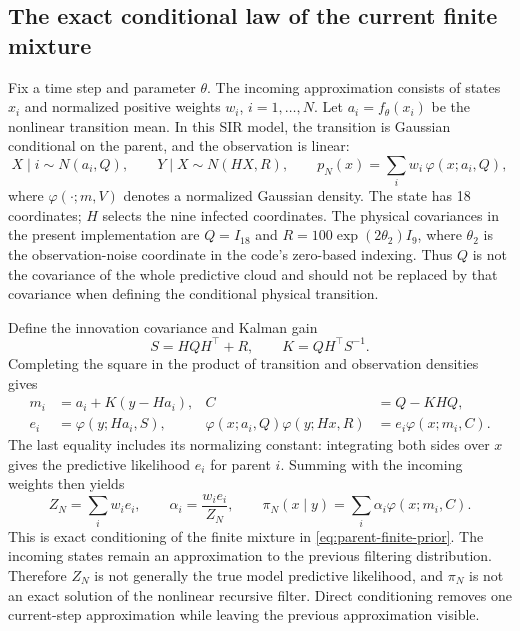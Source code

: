 \subsection{The exact conditional law of the current finite mixture}

Fix a time step and parameter $\theta$. The incoming approximation consists
of states $x_i$ and normalized positive weights $w_i$, $i=1,\ldots,N$.
Let $a_i=f_\theta(x_i)$ be the nonlinear transition mean. In this SIR model,
the transition is Gaussian conditional on the parent, and the observation is
linear:
\begin{equation}
 X\mid i\sim N(a_i,Q),\qquad Y\mid X\sim N(HX,R),\qquad
 p_N(x)=\sum_iw_i\,\varphi(x;a_i,Q),
 \label{eq:parent-finite-prior}
\end{equation}
where $\varphi(\cdot;m,V)$ denotes a normalized Gaussian density. The state has
18 coordinates; $H$ selects the nine infected coordinates. The physical
covariances in the present implementation are $Q=I_{18}$ and
$R=100\exp(2\theta_2)I_9$, where $\theta_2$ is the observation-noise
coordinate in the code's zero-based indexing. Thus $Q$ is not the covariance
of the whole predictive cloud and should not be replaced by that covariance
when defining the conditional physical transition.

Define the innovation covariance and Kalman gain
\begin{equation}
 S=HQH^\top+R,\qquad K=QH^\top S^{-1}.
\end{equation}
Completing the square in the product of transition and observation densities
gives
\begin{align}
 m_i&=a_i+K(y-Ha_i),& C&=Q-KHQ,\\
 e_i&=\varphi(y;Ha_i,S),&
 \varphi(x;a_i,Q)\varphi(y;Hx,R)
   &=e_i\varphi(x;m_i,C).
 \label{eq:parent-product-identity}
\end{align}
The last equality includes its normalizing constant: integrating both sides
over $x$ gives the predictive likelihood $e_i$ for parent $i$. Summing with
the incoming weights then yields
\begin{equation}
 Z_N=\sum_iw_i e_i,\qquad
 \alpha_i=\frac{w_i e_i}{Z_N},\qquad
 \pi_N(x\mid y)=\sum_i\alpha_i\varphi(x;m_i,C).
 \label{eq:parent-exact-posterior}
\end{equation}
This is exact conditioning of the finite mixture in
\eqref{eq:parent-finite-prior}. The incoming states remain an approximation
to the previous filtering distribution. Therefore $Z_N$ is not generally the
true model predictive likelihood, and $\pi_N$ is not an exact solution of the
nonlinear recursive filter. Direct conditioning removes one current-step
approximation while leaving the previous approximation visible.

